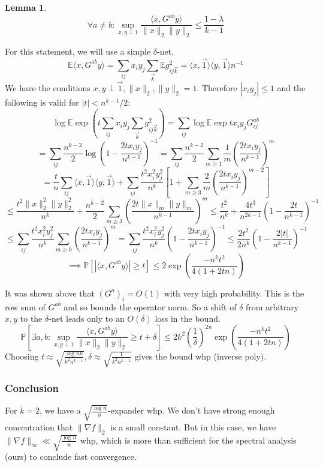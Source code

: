 \documentclass{article}
\newtheorem{lemma}[theorem]{Lemma}
\newcommand{\E}{\mathbb{E}}
\renewcommand{\Pr}{\mathbb{P}}
\begin{document}
\begin{lemma}
\[ \forall a \neq b: \sup_{x,y \perp 1} \dfrac{\langle x, G^{ab} y \rangle}{\|x\|_{2} \|y\|_{2}} \leq \frac{1 - \lambda}{k-1} \]
\end{lemma}
For this statement, we will use a simple $\delta$-net. 
\[ \E \langle x, G^{ab} y \rangle = \sum_{ij} x_{i} y_{j} \sum_{\vec{k}} \E g_{ij\vec{k}}^{2} = \langle x, \vec{1} \rangle \langle y, \vec{1} \rangle n^{-1}  \]
We have the conditions $x,y \perp \vec{1}, \|x\|_{2}, \|y\|_{2} = 1$. Therefore $|x_{i} y_{j}| \leq 1$ and the following is valid for $|t| < n^{k-1}/2$:
\[ \log \E \exp \left( t \sum_{ij} x_{i} y_{j} \sum_{\vec{k}} g_{ij\vec{k}}^{2}  \right) = \sum_{ij} \log \E \exp t x_{i} y_{j} G^{ab}_{ij} \]
\[ = \sum_{ij} \frac{n^{k-2}}{2} \log \left(1 - \frac{2t x_{i} y_{j}}{n^{k-1}}  \right)^{-1} = \sum_{ij} \frac{n^{k-2}}{2} \sum_{m \geq 1} \frac{1}{m} \left( \frac{2 t x_{i} y_{j}}{n^{k-1}} \right)^{m}  \]
\[ = \frac{t}{n} \sum_{ij} \langle x, \vec{1} \rangle \langle y, \vec{1} \rangle  + \sum_{ij} \frac{t^{2} x_{i}^{2} y_{j}^{2}}{n^{k}} \left[1 + \sum_{m \geq 3} \frac{2}{m} \left( \frac{2 t x_{i} y_{j}}{n^{k-1}} \right)^{m-2} \right]  \]
\[ \leq \frac{t^{2} \|x\|_{2}^{2} \|y\|_{2}^{2}}{n^{k}} + \frac{n^{k-2}}{2} \sum_{m \geq 3} \left( \frac{2 t \|x\|_{m} \|y\|_{m}}{n^{k-1}}  \right)^{m} \leq \frac{t^{2}}{n^{k}} + \frac{4 t^{3}}{n^{2k-1}} \left(1 - \frac{2 t}{n^{k-1}} \right)^{-1}   \]
\[ \leq \sum_{ij} \frac{t^{2} x_{i}^{2} y_{j}^{2}}{n^{k}} \sum_{m \geq 0} \left( \frac{2 t x_{i} y_{j}}{n^{k-1}} \right)^{m} = \sum_{ij} \frac{t^{2} x_{i}^{2} y_{j}^{2}}{n^{k}} \left( 1 - \frac{2 t x_{i} y_{j}}{n^{k-1}} \right)^{-1} \leq \frac{2t^{2}}{2n^{k}} \left(1 - \frac{2 |t|}{n^{k-1}} \right)^{-1}  \]
\[ \implies \Pr [ |\langle x, G^{ab} y \rangle| \geq t ] \leq 2 \exp \left( \frac{-n^{k} t^{2}}{4(1 + 2tn)}  \right)  \]

It was shown above that $(G^{a})_{i} = O(1)$ with very high probability. This is the row sum of $G^{ab}$ and so bounds the operator norm. So a shift of $\delta$ from arbitrary $x,y$ to the $\delta$-net leads only to an $O(\delta)$ loss in the bound. 
\[ \Pr [ \exists a,b:  \sup_{x,y \perp 1} \frac{\langle x, G^{ab} y \rangle}{\|x\|_{2} \|y\|_{2}} \geq t + \delta ] \leq 2 k^{2} \left( \frac{1}{\delta} \right)^{2n} \exp \left( \frac{- n^{k} t^{2}}{4(1 + 2tn)} \right)    \]
Choosing $t \approx \sqrt{\frac{\log nk}{k^{2} n^{k-1}}}, \delta \approx \sqrt{\frac{1}{k^{2} n^{k-1}}}$ gives the bound whp (inverse poly). 

\subsubsection{Conclusion}
For $k=2$, we have a $\sqrt{\frac{\log n}{n}}$-expander whp. We don't have strong enough concentration that $\|\nabla f\|_{2}$ is a small constant. But in this case, we have $\|\nabla f\|_{\infty} \ll \sqrt{\frac{\log n}{n}}$ whp, which is more than sufficient for the spectral analysis (ours) to conclude fast convergence. 
\end{document}
